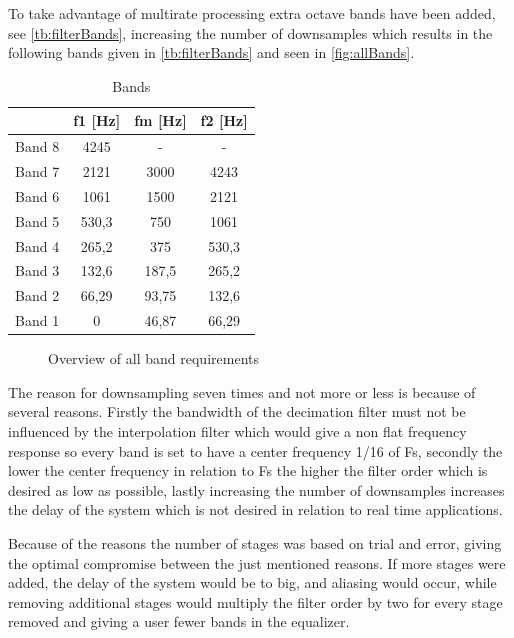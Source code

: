 To take advantage of multirate processing extra octave bands have been added, see \autoref{tb:filterBands}, increasing the number of downsamples which results in the following bands given in \autoref{tb:filterBands} and seen in \autoref{fig:allBands}.
\begin{table}[H]
\centering
\begin{tabular}{|c|c|c|c|}
\hline
       & f1 {[}Hz{]} & fm {[}Hz{]} & f2 {[}Hz{]} \\ \hline
Band 8 & 4245        & -           & -       	 \\ \hline
Band 7 & 2121        & 3000        & 4243        \\ \hline
Band 6 & 1061        & 1500        & 2121        \\ \hline
Band 5 & 530,3       & 750         & 1061        \\ \hline
Band 4 & 265,2       & 375         & 530,3       \\ \hline
Band 3 & 132,6       & 187,5       & 265,2       \\ \hline
Band 2 & 66,29       & 93,75       & 132,6       \\ \hline
Band 1 & 0     		 & 46,87       & 66,29       \\ \hline
\end{tabular}
\caption{Bands}
\label{tb:filterBands}
\end{table}   

\begin{figure}[H]
	\centering
	
	\caption{Overview of all band requirements}
	\label{fig:allBands}
\end{figure}
The reason for downsampling seven times and not more or less is because of several reasons. Firstly the bandwidth of the decimation filter must not be influenced by the interpolation filter which would give a non flat frequency response so every band is set to have a center frequency 1/16 of Fs, secondly the lower the center frequency in relation to Fs the higher the filter order which is desired as low as possible, lastly increasing the number of downsamples increases the delay of the system which is not desired in relation to real time applications.      

Because of the reasons the number of stages was based on trial and error, giving the optimal compromise between the just mentioned reasons. If more stages were added, the delay of the system would be to big, and aliasing would occur, while removing additional stages would multiply the filter order by two for every stage removed and giving a user fewer bands in the equalizer.    

